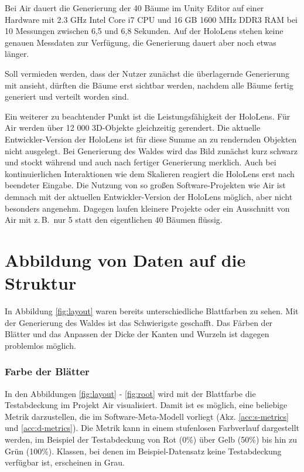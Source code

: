 Bei Air dauert die Generierung der 40 Bäume im Unity Editor auf einer Hardware mit 2.3 GHz Intel Core i7 CPU und 16 GB 1600 MHz DDR3 RAM bei 10 Messungen zwischen 6,5 und 6,8 Sekunden. Auf der HoloLens stehen keine genauen Messdaten zur Verfügung, die Generierung dauert aber noch etwas länger.

Soll vermieden werden, dass der Nutzer zunächst die überlagernde Generierung mit ansieht, dürften die Bäume erst sichtbar werden, nachdem alle Bäume fertig generiert und verteilt worden sind.

Ein weiterer zu beachtender Punkt ist die Leistungsfähigkeit der HoloLens. Für Air werden über 12 000 3D-Objekte gleichzeitig gerendert. Die aktuelle Entwickler-Version der HoloLens ist für diese Summe an zu rendernden Objekten nicht ausgelegt. Bei Generierung des Waldes wird das Bild zunächst kurz schwarz und stockt während und auch nach fertiger Generierung merklich. Auch bei kontinuierlichen Interaktionen wie dem Skalieren reagiert die HoloLens erst nach beendeter Eingabe. Die Nutzung von so großen Software-Projekten wie Air ist demnach mit der aktuellen Entwickler-Version der HoloLens möglich, aber nicht besonders angenehm. Dagegen laufen kleinere Projekte oder ein Ausschnitt von Air mit z.\,B.\ nur 5 statt den eigentlichen 40 Bäumen flüssig.

\section{Abbildung von Daten auf die Struktur}
\label{sec:data}

In Abbildung \ref{fig:layout} waren bereits unterschiedliche Blattfarben zu sehen. Mit der Generierung des Waldes ist das Schwierigste geschafft. Das Färben der Blätter und das Anpassen der Dicke der Kanten und Wurzeln ist dagegen problemlos möglich.

\subsubsection*{Farbe der Blätter}

In den Abbildungen \ref{fig:layout} - \ref{fig:root} wird mit der Blattfarbe die Testabdeckung im Projekt Air visualisiert. Damit ist es möglich, eine beliebige Metrik darzustellen, die im Software-Meta-Modell vorliegt (Akz. \ref{acc:s-metrics} und \ref{acc:d-metrics}). Die Metrik kann in einem stufenlosen Farbverlauf dargestellt werden, im Beispiel der Testabdeckung von Rot (0\%) über Gelb (50\%) bis hin zu Grün (100\%). Klassen, bei denen im Beispiel-Datensatz keine Testabdeckung verfügbar ist, erscheinen in Grau.

